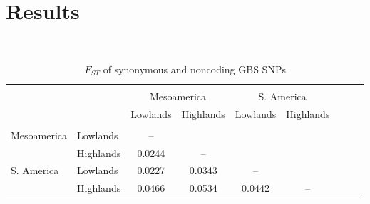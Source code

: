 \section*{Results}

\renewcommand{\arraystretch}{1.1}
\begin{table}[tb]

\begin{center}
 \caption[]{$F_{ST}$ of synonymous and noncoding GBS SNPs}
  \textbf{}\\[-2mm]
{\fontsize{6}{9}\sf
    \begin{tabular}{llccccccl}
    \hline
    & & \\[-3mm]
	&		&	\multicolumn{2}{c}{Mesoamerica}		&	\multicolumn{2}{c}{S. America}		\\
	&		&	Lowlands	&	Highlands	&	Lowlands	&	Highlands	\\
      \hline
    & & \\[-3mm]
Mesoamerica	&	Lowlands	&	--		&			&			&		\\
		&	Highlands	&	0.0244	&	--		&			&		\\
S. America		&	Lowlands	&	0.0227	&	0.0343	&	--		&		\\
		&	Highlands	&	0.0466	&	0.0534	&	0.0442	&	--	\\ [1mm]
    \hline
    \end{tabular}
    \label{FstP}  %
}
\end{center}
\end{table}
\renewcommand{\arraystretch}{1}

